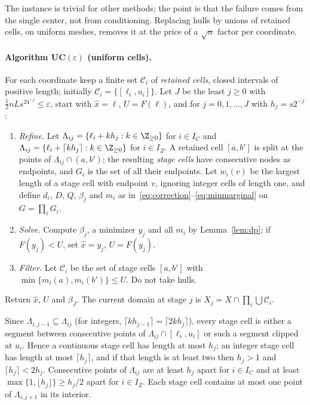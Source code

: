 The instance is trivial for other methods; the point is that the failure
comes from the single center, not from conditioning. Replacing hulls by
unions of retained cells, on uniform meshes, removes it at the price of a
$\sqrt n$ factor per coordinate.

\paragraph{Algorithm UC$(\varepsilon)$ (uniform cells).}
For each coordinate keep a finite set $\mathcal C_i$ of \emph{retained cells},
closed intervals of positive length; initially $\mathcal C_i=\{[\ell_i,u_i]\}$.
Let $J$ be the least $j\ge0$ with $\frac12nLs^24^{-j}\le\varepsilon$, start
with $\hat x=\ell$, $U=F(\ell)$, and for $j=0,1,\dots,J$ with $h_j=s2^{-j}$:
\begin{enumerate}[label=(\roman*)]
\item \emph{Refine.} Let $\Lambda_{ij}=\{\ell_i+kh_j:k\in\Z_{\ge0}\}$ for
$i\in I_C$ and $\Lambda_{ij}=\{\ell_i+\lceil kh_j\rceil:k\in\Z_{\ge0}\}$ for
$i\in I_Z$. A retained cell $[a,b']$ is split at the points of
$\Lambda_{ij}\cap(a,b')$; the resulting \emph{stage cells} have consecutive
nodes as endpoints, and $G_i$ is the set of all their endpoints. Let
$w_i(v)$ be the largest length of a stage cell with endpoint $v$, ignoring
integer cells of length one, and define $d_i$, $D$, $Q$, $\beta_j$ and $m_i$
as in~\eqref{eq:correction}--\eqref{eq:minmarginal} on $G=\prod_iG_i$.
\item \emph{Solve.} Compute $\beta_j$, a minimizer $y_j$ and all $m_i$ by
Lemma~\ref{lem:dp}; if $F(y_j)<U$, set $\hat x=y_j$, $U=F(y_j)$.
\item \emph{Filter.} Let $\mathcal C_i$ be the set of stage cells $[a,b']$
with $\min\{m_i(a),m_i(b')\}\le U$. Do not take hulls.
\end{enumerate}
Return $\hat x$, $U$ and $\beta_J$. The current domain at stage $j$ is
$X_j=X\cap\prod_i\bigcup\mathcal C_i$.

Since $\Lambda_{i,j-1}\subseteq\Lambda_{ij}$ (for integers,
$\lceil kh_{j-1}\rceil=\lceil 2kh_j\rceil$), every stage cell is either a
segment between consecutive points of $\Lambda_{ij}\cap[\ell_i,u_i]$ or such
a segment clipped at $u_i$. Hence a continuous stage cell has length at most
$h_j$; an integer stage cell has length at most $\lceil h_j\rceil$, and if
that length is at least two then $h_j>1$ and $\lceil h_j\rceil<2h_j$.
Consecutive points of $\Lambda_{ij}$ are at least $h_j$ apart for $i\in I_C$
and at least $\max\{1,\lfloor h_j\rfloor\}\ge h_j/2$ apart for $i\in I_Z$.
Each stage cell contains at most one point of $\Lambda_{i,j+1}$ in its
interior.

